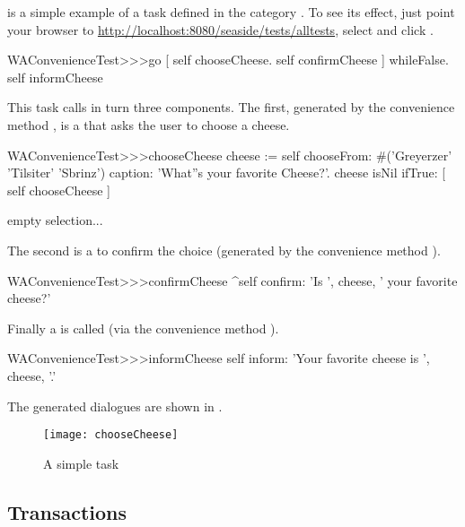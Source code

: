 \documentclass[a4paper,10pt,twoside]{book}
\begin{document}
 is a simple example of a task defined in the category
.
To see its effect, just point your browser to
\url{http://localhost:8080/seaside/tests/alltests}, select  and
click .

\begin{code}{}
WAConvenienceTest>>>go
	[ self chooseCheese.
	  self confirmCheese ] whileFalse.
	self informCheese
\end{code}

This task calls in turn three components.
The first, generated by the convenience method , is a  that asks the user to choose a cheese.

\begin{code}{}
WAConvenienceTest>>>chooseCheese
	cheese := self
		chooseFrom: #('Greyerzer' 'Tilsiter' 'Sbrinz')
		caption: 'What''s your favorite Cheese?'.
	cheese isNil ifTrue: [ self chooseCheese ]
\end{code}

empty selection...

The second is a  to confirm the choice (generated by the
convenience method ).

\begin{code}{}
WAConvenienceTest>>>confirmCheese
	^self confirm: 'Is ', cheese,  ' your favorite cheese?'
\end{code}

Finally a  is called (via the convenience method
).

\begin{code}{}
WAConvenienceTest>>>informCheese
	self inform: 'Your favorite cheese is ', cheese, '.'
\end{code}

The generated dialogues are shown in .

\begin{figure}[ht]
\begin{center}
\texttt{[image: chooseCheese]}
\caption{A simple task}
\end{center}
\end{figure}

\subsection{Transactions}
\end{document}
